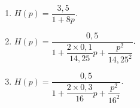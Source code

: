 \ifprof
\else
\begin{solution}
\begin{enumerate}
\item  $H(p)=\dfrac{3,5}{1+8p}$.
\item $H(p)=\dfrac{0,5}{1+\dfrac{2\times 0,1}{14,25}p+\dfrac{p^2}{14,25^2}}$.
\item $H(p)=\dfrac{0,5}{1+\dfrac{2\times 0,3}{16}p+\dfrac{p^2}{16^2}}$.
\end{enumerate}
\end{solution}


\fi

